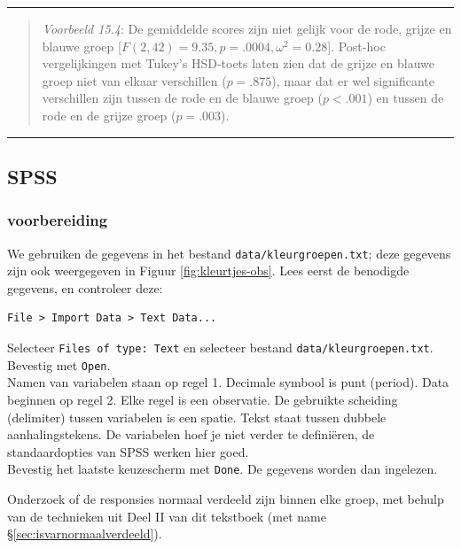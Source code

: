 \documentclass[
]{book}
\begin{document}
\begin{center}\rule{0.5\linewidth}{0.5pt}\end{center}

\begin{quote}
\emph{Voorbeeld 15.4}:
De gemiddelde scores zijn niet gelijk voor de rode, grijze en blauwe groep
{[}\(F(2,42) = 9.35, p = .0004, \omega^2 = 0.28\){]}.
Post-hoc vergelijkingen met Tukey's HSD-toets laten zien dat de grijze en blauwe groep niet van elkaar verschillen (\(p=.875\)), maar dat er wel significante verschillen zijn tussen de rode en de blauwe groep (\(p<.001\)) en tussen de rode en de grijze groep (\(p=.003\)).
\end{quote}

\begin{center}\rule{0.5\linewidth}{0.5pt}\end{center}

\hypertarget{spss-12}{%
\subsection{SPSS}\label{spss-12}}

\hypertarget{voorbereiding-1}{%
\subsubsection{voorbereiding}\label{voorbereiding-1}}

We gebruiken de gegevens in het bestand \texttt{data/kleurgroepen.txt}; deze gegevens zijn ook weergegeven in Figuur \ref{fig:kleurtjes-obs}.
Lees eerst de benodigde gegevens, en controleer deze:

\begin{verbatim}
File > Import Data > Text Data...
\end{verbatim}

Selecteer \texttt{Files\ of\ type:\ Text} en selecteer bestand
\texttt{data/kleurgroepen.txt}. Bevestig met \texttt{Open}.\\
Namen van variabelen staan op regel 1. Decimale symbool is punt
(period). Data beginnen op regel 2. Elke regel is een observatie. De
gebruikte scheiding (delimiter) tussen variabelen is een spatie. Tekst
staat tussen dubbele aanhalingstekens. De variabelen hoef je niet verder
te definiëren, de standaardopties van SPSS werken hier goed.\\
Bevestig het laatste keuzescherm met \texttt{Done}. De gegevens
worden dan ingelezen.

Onderzoek of de responsies normaal verdeeld zijn binnen elke groep, met behulp van de
technieken uit Deel II van dit tekstboek (met name
§\ref{sec:isvarnormaalverdeeld}).
\end{document}
